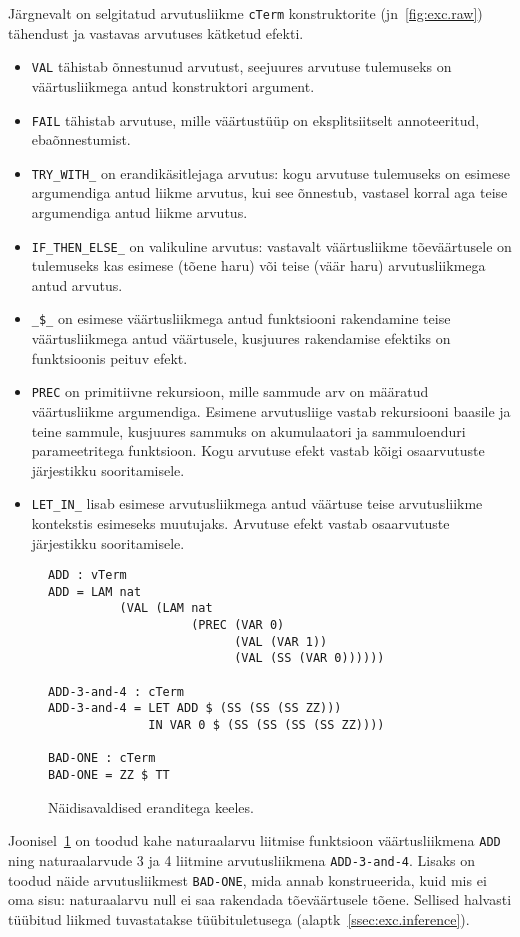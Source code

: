 \documentclass[a4paper,12pt]{article}
\begin{document}
Järgnevalt on selgitatud arvutusliikme {\tt cTerm} konstruktorite (jn~\ref{fig:exc.raw}) tähendust ja vastavas arvutuses kätketud efekti.
\begin{itemize}
\item {\tt VAL} tähistab õnnestunud arvutust, seejuures arvutuse tulemuseks on väärtusliikmega antud konstruktori argument.
\item {\tt FAIL} tähistab arvutuse, mille väärtustüüp on eksplitsiitselt annoteeritud, ebaõnnestumist.
\item {\tt TRY_WITH_} on erandikäsitlejaga arvutus: kogu arvutuse tulemuseks on esimese argumendiga antud liikme arvutus, kui see õnnestub, vastasel korral aga teise argumendiga antud liikme arvutus.
\item {\tt IF_THEN_ELSE_} on valikuline arvutus: vastavalt väärtusliikme tõeväärtusele on tulemuseks kas esimese (tõene haru) või teise (väär haru) arvutusliikmega antud arvutus.
\item {\tt _\$_} on esimese väärtusliikmega antud funktsiooni rakendamine teise väärtusliikmega antud väärtusele, kusjuures rakendamise efektiks on funktsioonis peituv efekt.
\item {\tt PREC} on primitiivne rekursioon, mille sammude arv on määratud väärtusliikme argumendiga. Esimene arvutusliige vastab rekursiooni baasile ja teine sammule, kusjuures sammuks on akumulaatori ja sammuloenduri parameetritega funktsioon. Kogu arvutuse efekt vastab kõigi osaarvutuste järjestikku sooritamisele.
\item {\tt LET_IN_} lisab esimese arvutusliikmega antud väärtuse teise arvutusliikme kontekstis esimeseks muutujaks. Arvutuse efekt vastab osaarvutuste järjestikku sooritamisele.
\end{itemize}

\begin{figure}
  \begin{BVerbatim}
ADD : vTerm
ADD = LAM nat
          (VAL (LAM nat
                    (PREC (VAR 0)
                          (VAL (VAR 1))
                          (VAL (SS (VAR 0))))))

ADD-3-and-4 : cTerm
ADD-3-and-4 = LET ADD $ (SS (SS (SS ZZ)))
              IN VAR 0 $ (SS (SS (SS (SS ZZ))))

BAD-ONE : cTerm
BAD-ONE = ZZ $ TT
  \end{BVerbatim}
  \caption{Näidisavaldised eranditega keeles.}
  \label{fig:exc.raw.ex1}
\end{figure}

Joonisel~\ref{fig:exc.raw.ex1} on toodud kahe naturaalarvu liitmise funktsioon väärtusliikmena {\tt ADD}
ning naturaalarvude 3 ja 4 liitmine arvutusliikmena {\tt ADD-3-and-4}.
Lisaks on toodud näide arvutusliikmest {\tt BAD-ONE}, mida annab konstrueerida,
kuid mis ei oma sisu: naturaalarvu null ei saa rakendada tõeväärtusele tõene.
Sellised halvasti tüübitud liikmed tuvastatakse tüübituletusega (alaptk~\ref{ssec:exc.inference}).
\end{document}
